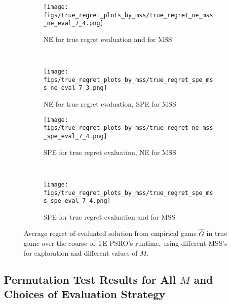 \begin{figure}[H]
    \centering
    \begin{subfigure}[b]{0.48\textwidth}
    \texttt{[image: figs/true\_regret\_plots\_by\_mss/true\_regret\_ne\_mss\_ne\_eval\_7\_4.png]}
    \caption{NE for true regret evaluation and for MSS}
    \label{fig:app_regret_ne_mss_ne_eval}
    \end{subfigure}~
    \begin{subfigure}[b]{0.48\textwidth}
    \texttt{[image: figs/true\_regret\_plots\_by\_mss/true\_regret\_spe\_mss\_ne\_eval\_7\_3.png]}
    \caption{NE for true regret evaluation, SPE for MSS}
    \label{fig:app_regret_spe_mss_ne_eval}
    \end{subfigure}
    \begin{subfigure}[b]{0.48\textwidth}
    \texttt{[image: figs/true\_regret\_plots\_by\_mss/true\_regret\_ne\_mss\_spe\_eval\_7\_4.png]}
    \caption{SPE for true regret evaluation, NE for MSS}
    \label{fig:app_regret_ne_mss_spe_eval}
    \end{subfigure}~
    \begin{subfigure}[b]{0.48\textwidth}
    \texttt{[image: figs/true\_regret\_plots\_by\_mss/true\_regret\_spe\_mss\_spe\_eval\_7\_4.png]}
    \caption{SPE for true regret evaluation and for MSS}
    \label{fig:app_regret_spe_mss_spe_eval}
    \end{subfigure}
    \caption{Average regret of evaluated solution from empirical game $\hat{G}$ in true game over the course of TE-PSRO's runtime, using different MSS's for exploration and different values of $M$.}
    \label{fig:app_true_regret_no_NF}
\end{figure}

\newpage
\subsection{Permutation Test Results for All $M$ and Choices of Evaluation Strategy}
\label{app:p-values}

